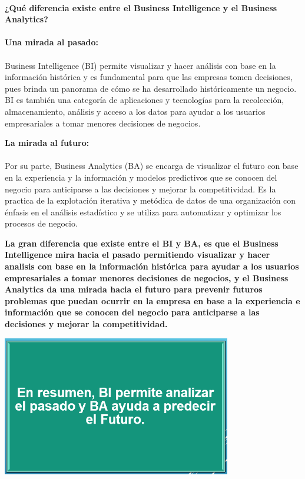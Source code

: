 \documentclass[a4paper,12pt,twocolumn]{article}
\begin{document}
\textbf{}\\
\textbf{¿Qué diferencia existe entre el Business Intelligence y el Business Analytics?}\\
\textbf{}\\
\textbf{Una mirada al pasado:}\\
\textbf{}\\
Business Intelligence (BI) permite visualizar y hacer análisis con base en la información histórica y es fundamental para que las empresas tomen decisiones, pues brinda un panorama de cómo se ha desarrollado históricamente un negocio. BI es también una categoría de aplicaciones y tecnologías para la recolección, almacenamiento, análisis y acceso a los datos para ayudar a los usuarios empresariales a tomar menores decisiones de negocios.
\item
\textbf{La mirada al futuro:}\\
\textbf{}\\
Por su parte, Business Analytics (BA) se encarga de visualizar el futuro con base en la experiencia y la información y modelos predictivos que se conocen del negocio para anticiparse a las decisiones y
mejorar la competitividad. Es la practica de la explotación iterativa y metódica de datos de una organización con énfasis en el análisis estadístico y se utiliza para automatizar y optimizar los procesos de negocio.
\item
\textbf{La gran  diferencia que existe entre el BI y BA, es que el Business Intelligence mira  hacia el pasado permitiendo visualizar y hacer analisis con base  en la información histórica para  ayudar a los usuarios empresariales a tomar menores decisiones de negocios, y el Business Analytics da una mirada hacia el futuro para  prevenir futuros problemas que puedan ocurrir en la empresa en  base  a la  experiencia e información  que  se  conocen del  negocio  para anticiparse a las decisiones y mejorar la competitividad.}

\item
\begin{center}
\includegraphics[width=10cm]{./Imagenes/image05}
\end{center}
\item
\end{document}
